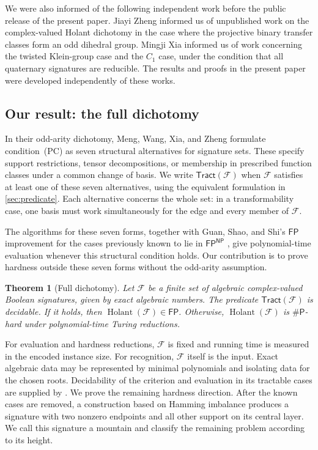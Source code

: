 \documentclass[11pt,letterpaper,onecolumn]{article}
\theoremstyle{plain}
\newtheorem{theorem}{Theorem}[section]
\theoremstyle{definition}
\theoremstyle{remark}
\newcommand{\cF}{\mathcal F}
\newcommand{\Holant}{\operatorname{Holant}}
\newcommand{\Tract}{\mathsf{Tract}}
\newcommand{\FP}{\mathsf{FP}}
\newcommand{\SharpP}{\#\mathsf P}
\begin{document}
We were also informed of the following independent work before the
public release of the present paper.
Jiayi Zheng informed us of unpublished work on the complex-valued Holant
dichotomy in the case where the projective binary transfer classes form an
odd dihedral group.
Mingji Xia informed us of work concerning the twisted Klein-group case
and the \(C_1\) case, under the condition that all quaternary signatures
are reducible.
The results and proofs in the present paper were developed independently
of these works.

\subsection{Our result: the full dichotomy}
\label{short:subsec:main}

In their odd-arity dichotomy, Meng, Wang, Xia, and Zheng
\cite[conference version, Theorem~30; full version, Theorem~33]{MengWangXiaZheng2025}
formulate condition~(PC) as seven structural alternatives for signature
sets. These specify support restrictions, tensor decompositions, or
membership in prescribed function classes under a common change of basis.
We write \(\Tract(\cF)\) when \(\cF\) satisfies at least one of these
seven alternatives, using the equivalent formulation in
\cref{sec:predicate}. Each alternative concerns
the whole set: in a transformability case, one basis must work
simultaneously for the edge and every member of \(\cF\).

The algorithms for these seven forms, together with Guan, Shao, and Shi's
\(\FP\) improvement for the cases previously known to lie in
\(\FP^{\mathsf{NP}}\) \cite{GuanShaoShi2026}, give polynomial-time
evaluation whenever this structural condition holds. Our contribution is
to prove hardness outside these seven forms without the odd-arity
assumption.

\begin{theorem}[Full dichotomy]
\label{short:thm:main}
Let \(\cF\) be a finite set of algebraic complex-valued Boolean signatures,
given by exact algebraic numbers. The predicate \(\Tract(\cF)\) is
decidable. If it holds, then \(\Holant(\cF)\in\FP\). Otherwise,
\(\Holant(\cF)\) is \(\SharpP\)-hard under polynomial-time Turing reductions.
\end{theorem}

For evaluation and hardness reductions, \(\cF\) is fixed and running time
is measured in the encoded instance size. For recognition, \(\cF\) itself
is the input. Exact algebraic data may be represented by minimal polynomials
and isolating data for the chosen roots. Decidability of the criterion and
evaluation in its tractable cases are supplied by
\cite[Theorem~2.22]{Liu2026DEQ2Holant}. We prove the remaining hardness
direction. After the known cases are removed, a construction based on
Hamming imbalance produces a signature with two nonzero endpoints and all
other support on its central layer. We call this signature a mountain and
classify the remaining problem according to its height.
\end{document}
